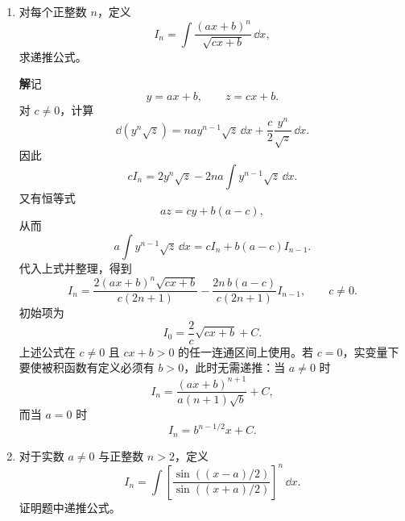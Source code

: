 \begin{enumerate}
\begin{enumerate}[label=(\arabic*)]
    \item
    \[
      \int\sin x\ln(\sin x)\,\dd x.
    \]
    实对数要求 $\sin x>0$。令 $u=\cos x$，则
    \[
      I=-\frac12\int\ln(1-u^2)\,\dd u.
    \]
    分部积分可得
    \[
      \int\ln(1-u^2)\,\dd u
      =u\ln(1-u^2)-2u+\ln\abs{\frac{1+u}{1-u}}+C.
    \]
    代回 $u=\cos x$，并用 $\ln(1-\cos^2x)=2\ln(\sin x)$，得到
    \[
      \boxed{
      \cos x\,[1-\ln(\sin x)]
      +\ln\abs{\tan\frac x2}+C}.
    \]

    \item
    \[
      \int\frac{\dd x}{\sin(x+a)\sin(x+b)}.
    \]
    若 $\sin(b-a)\ne0$，利用
    \[
      \cot(x+a)-\cot(x+b)
      =\frac{\sin(b-a)}{\sin(x+a)\sin(x+b)},
    \]
    得
    \[
      \boxed{
      \frac1{\sin(b-a)}
      \ln\abs{\frac{\sin(x+a)}{\sin(x+b)}}+C}.
    \]
    若 $b-a=k\pi$，则
    \[
      \sin(x+b)=(-1)^k\sin(x+a),
    \]
    因而
    \[
      \boxed{
      \int\frac{\dd x}{\sin(x+a)\sin(x+b)}
      =(-1)^{k+1}\cot(x+a)+C}.
    \]

    \item
    \[
      \int\frac{1-x^n}{x(1+x^n)}\,\dd x,
      \qquad n\in\NN_+.
    \]
    因
    \[
      \frac{1-x^n}{x(1+x^n)}
      =\frac1x-\frac{2x^{n-1}}{1+x^n},
    \]
    故
    \[
      \boxed{\ln\abs{x}-\frac2n\ln\abs{1+x^n}+C}.
    \]
  \end{enumerate}

  \item 对每个正整数 $n$，定义
  \[
    I_n=\int\frac{(ax+b)^n}{\sqrt{cx+b}}\,\dd x,
  \]
  求递推公式。

  \textbf{解}\quad 记
  \[
    y=ax+b,
    \qquad z=cx+b.
  \]
  对 $c\ne0$，计算
  \[
    \dd(y^n\sqrt z)
    =na y^{n-1}\sqrt z\,\dd x
     +\frac c2\frac{y^n}{\sqrt z}\,\dd x.
  \]
  因此
  \[
    cI_n=2y^n\sqrt z-2na\int y^{n-1}\sqrt z\,\dd x.
  \]
  又有恒等式
  \[
    az=cy+b(a-c),
  \]
  从而
  \[
    a\int y^{n-1}\sqrt z\,\dd x
    =cI_n+b(a-c)I_{n-1}.
  \]
  代入上式并整理，得到
  \[
    \boxed{
    I_n=\frac{2(ax+b)^n\sqrt{cx+b}}{c(2n+1)}
    -\frac{2n\,b(a-c)}{c(2n+1)}I_{n-1}},
    \qquad c\ne0.
  \]
  初始项为
  \[
    I_0=\frac2c\sqrt{cx+b}+C.
  \]
  上述公式在 $c\ne0$ 且 $cx+b>0$ 的任一连通区间上使用。若 $c=0$，实变量下要使被积函数有定义必须有 $b>0$，此时无需递推：当 $a\ne0$ 时
  \[
    I_n=\frac{(ax+b)^{n+1}}{a(n+1)\sqrt b}+C,
  \]
  而当 $a=0$ 时
  \[
    I_n=b^{n-1/2}x+C.
  \]

  \item 对于实数 $a\ne0$ 与正整数 $n>2$，定义
  \[
    I_n=\int\left[
      \frac{\sin((x-a)/2)}{\sin((x+a)/2)}
    \right]^n\,\dd x.
  \]
  证明题中递推公式。


\end{enumerate}
